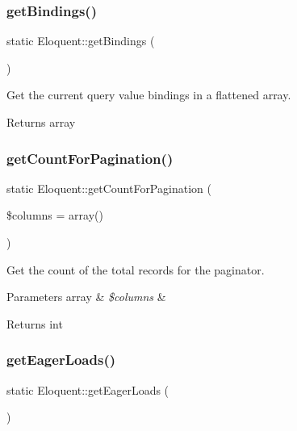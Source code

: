 \subsubsection{\texorpdfstring{get\+Bindings()}{getBindings()}}
{\footnotesize\ttfamily static Eloquent\+::get\+Bindings (\begin{DoxyParamCaption}{ }\end{DoxyParamCaption})\hspace{0.3cm}{\ttfamily [static]}}

Get the current query value bindings in a flattened array.

\begin{DoxyReturn}{Returns}
array 
\end{DoxyReturn}
\mbox{\label{class_eloquent_a1978abdf53fe44de908f19767234e984}} 
\subsubsection{\texorpdfstring{get\+Count\+For\+Pagination()}{getCountForPagination()}}
{\footnotesize\ttfamily static Eloquent\+::get\+Count\+For\+Pagination (\begin{DoxyParamCaption}\item[{}]{\$columns = {\ttfamily array()} }\end{DoxyParamCaption})\hspace{0.3cm}{\ttfamily [static]}}

Get the count of the total records for the paginator.


\begin{DoxyParams}[1]{Parameters}
array & {\em \$columns} & \\
\hline
\end{DoxyParams}
\begin{DoxyReturn}{Returns}
int 
\end{DoxyReturn}
\mbox{\label{class_eloquent_a2384b7d44541eec22f7d5a34c4bac4a4}} 
\subsubsection{\texorpdfstring{get\+Eager\+Loads()}{getEagerLoads()}}
{\footnotesize\ttfamily static Eloquent\+::get\+Eager\+Loads (\begin{DoxyParamCaption}{ }\end{DoxyParamCaption})\hspace{0.3cm}{\ttfamily [static]}}

